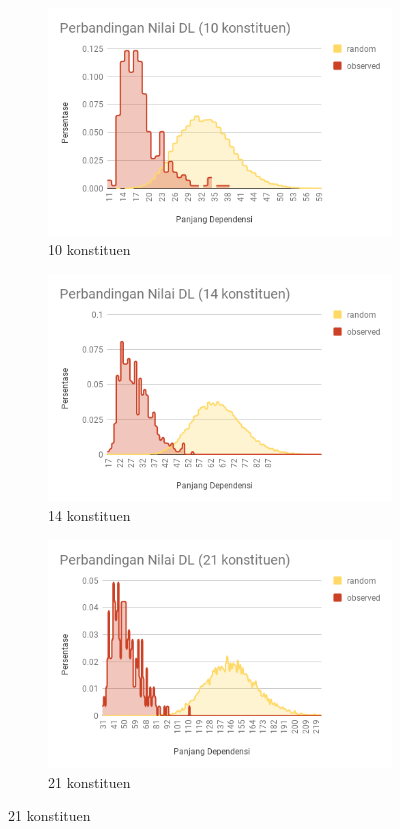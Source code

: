 \begin{figure}
\begin{subfigure}{.45\textwidth}
  \centering
  \includegraphics[width=1\linewidth]{pics/t10randomobs.png}
  \caption{10 konstituen}
  \label{fig:t10randomobs} 
\end{subfigure}
%
\begin{subfigure}{.45\textwidth}
  \centering
  \includegraphics[width=1\linewidth]{pics/t14randomobs.png}
  \caption{14 konstituen}
  \label{fig:t14randomobs} 
\end{subfigure}
%
\begin{subfigure}{.45\textwidth}
  \centering
  \includegraphics[width=1\linewidth]{pics/t21randomobs.png}
  \caption{21 konstituen}
  \label{fig:t21randomobs} 
\end{subfigure}


\end{figure}
